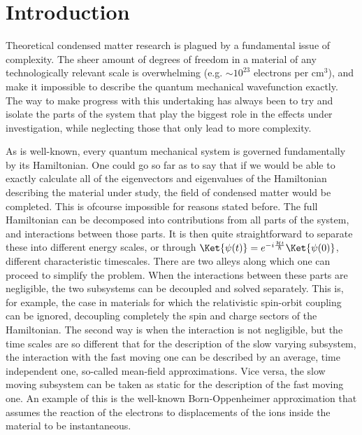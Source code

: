 \chapter{Introduction}
Theoretical condensed matter research is plagued by a fundamental issue of complexity. The sheer amount of degrees of freedom in a material of any technologically relevant scale is overwhelming (e.g. $\sim10^{23}$ electrons per cm$^3$), and make it impossible to describe the quantum mechanical wavefunction exactly.
The way to make progress with this undertaking has always been to try and isolate the parts of the system that play the biggest role in the effects under investigation, while neglecting those that only lead to more complexity.

As is well-known, every quantum mechanical system is governed fundamentally by its Hamiltonian. One could go so far as to say that if we would be able to exactly calculate all of the eigenvectors and eigenvalues of the Hamiltonian describing the material under study, the field of condensed matter would be completed. This is ofcourse impossible for reasons stated before.
The full Hamiltonian can be decomposed into contributions from all parts of the system, and interactions between those parts.
It is then quite straightforward to separate these into different energy scales, or through $\Ket{\psi(t)} = e^{-i \frac{\mathcal{H}t}{\hbar}}\Ket{\psi(0)}$, different characteristic timescales.
There are two alleys along which one can proceed to simplify the problem. When the interactions between these parts are negligible, the two subsystems can be decoupled and solved separately.
This is, for example, the case in materials for which the relativistic spin-orbit coupling can be ignored, decoupling completely the spin and charge sectors of the Hamiltonian.
The second way is when the interaction is not negligible, but the time scales are so different that for the description of the slow varying subsystem, the interaction with the fast moving one can be described by an average, time independent one, so-called mean-field approximations.
Vice versa, the slow moving subsystem can be taken as static for the description of the fast moving one.
An example of this is the well-known Born-Oppenheimer approximation that assumes the reaction of the electrons to displacements of the ions inside the material to be instantaneous.

